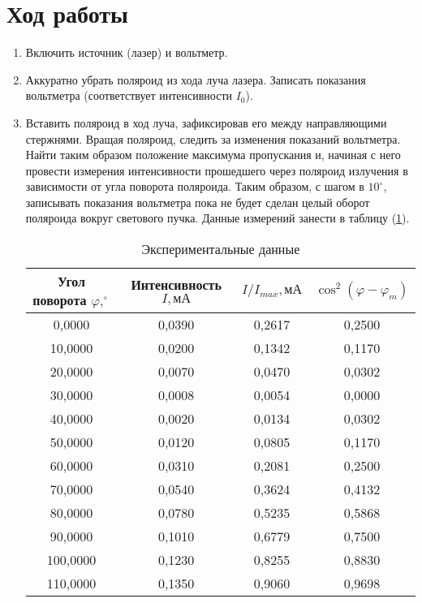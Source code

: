 \documentclass[12pt]{article}
\let\oldref\ref
\renewcommand{\ref}[1]{(\oldref{#1})}
\begin{document}
    \section*{Ход работы}
    \begin{enumerate}[wide, labelwidth=!, labelindent=0pt]
        \item Включить источник (лазер) и вольтметр.
        \item Аккуратно убрать поляроид из хода луча лазера. Записать показания вольтметра (соответствует интенсивности  $ I_0 $).
        \item Вставить поляроид в ход луча, зафиксировав его между направляющими стержнями. Вращая поляроид, следить за изменения показаний вольтметра. Найти таким образом положение максимума пропускания и, начиная с него провести измерения интенсивности прошедшего через поляроид излучения в зависимости от угла поворота поляроида. Таким образом, с шагом в $ 10^\circ $, записывать показания вольтметра пока не будет сделан целый оборот поляроида вокруг светового пучка. Данные измерений занести в таблицу \ref{tab:1}.
        \begin{table}[h!]
            \caption{Экспериментальные данные}
            \label{tab:1}
            \centering
            \begin{tabular}{|c|c|c|c|}
                \hline
                Угол поворота $ \varphi, ^\circ $    &  Интенсивность $ I, мА $ &  $ I/I_{max}, мА $ & $ \cos^2{(\varphi - \varphi_m)} $ \\
                \hline                
                0,0000 & 0,0390 & 0,2617 & 0,2500\\ 
 \hline 
10,0000 & 0,0200 & 0,1342 & 0,1170\\ 
 \hline 
20,0000 & 0,0070 & 0,0470 & 0,0302\\ 
 \hline 
30,0000 & 0,0008 & 0,0054 & 0,0000\\ 
 \hline 
40,0000 & 0,0020 & 0,0134 & 0,0302\\ 
 \hline 
50,0000 & 0,0120 & 0,0805 & 0,1170\\ 
 \hline 
60,0000 & 0,0310 & 0,2081 & 0,2500\\ 
 \hline 
70,0000 & 0,0540 & 0,3624 & 0,4132\\ 
 \hline 
80,0000 & 0,0780 & 0,5235 & 0,5868\\ 
 \hline 
90,0000 & 0,1010 & 0,6779 & 0,7500\\ 
 \hline 
100,0000 & 0,1230 & 0,8255 & 0,8830\\ 
 \hline 
110,0000 & 0,1350 & 0,9060 & 0,9698\\ 

\end{tabular}
\end{table}
\end{enumerate}
\end{document}
